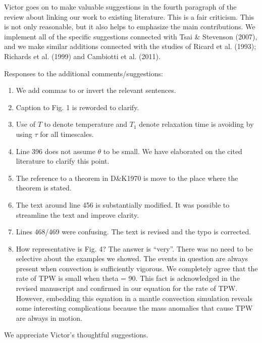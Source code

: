 \documentclass[a4paper,12pt]{article}
\begin{document}
Victor goes on to make valuable suggestions in the fourth paragraph of the review about linking our work to existing literature.
This is a fair criticism.
This is not only reasonable, but it also helps to emphasize the main contributions.
We implement all of the specific suggestions connected with Tsai \& Stevenson (2007), and we make similar additions connected with the studies of 
Ricard et al. (1993); Richards et al. (1999) and Cambiotti et al. (2011).

Responses to the additional comments/suggestions:

\begin{enumerate}

\item We add commas to or invert the relevant sentences.

\item Caption to Fig. 1 is reworded to clarify.

\item Use of $T$ to denote temperature and $T_1$ denote relaxation time is avoiding by using $\tau$ for all timescales.

\item Line 396 does not assume $\theta$ to be small. We have elaborated on the cited literature to clarify this point. 

\item The reference to a theorem in D\&K1970 is move to the place where the theorem is stated.

\item The text around line 456 is substantially modified. It was possible to streamline the text and improve clarity.

\item Lines 468/469 were confusing. The text is revised and the typo is corrected.

\item How representative is Fig. 4? The answer is ``very''. There was no need to be selective about the examples we showed. The events in question are always present when convection is sufficiently vigorous. We completely agree that the rate of TPW is small when theta = 90. This fact is acknowledged in the revised manuscript and confirmed in our equation for the rate of TPW. However, embedding this equation in a mantle convection simulation reveals some interesting complications because the mass anomalies that cause TPW are always in motion.

\end{enumerate}

We appreciate Victor's thoughtful suggestions.
\end{document}
